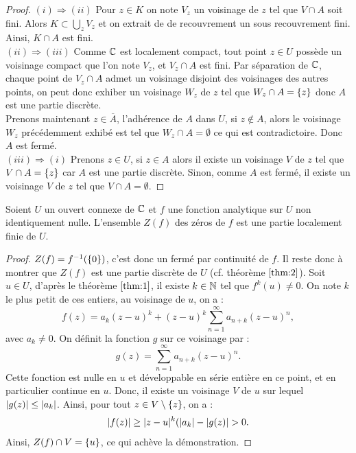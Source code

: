 \begin{proof}
$(i) \Rightarrow (ii)$ Pour $z \in K$ on note $V_z$ un voisinage de $z$ tel que $V \cap A$ soit fini.
Alors $K \subset \bigcup_{z} V_z$ et on extrait de de recouvrement un sous recouvrement fini. 
Ainsi, $K \cap A$ est fini. \\

$(ii) \Rightarrow (iii)$ Comme $\mathbb{C}$ est localement compact, tout point $z \in U$ possède un voisinage compact que l'on note $V_z$,
et $V_z \cap A$ est fini. 
Par séparation de $\mathbb{C}$, chaque point de $V_z \cap A$ admet un voisinage disjoint des voisinages des autres points, on peut donc
exhiber un voisinage $W_z$ de $z$ tel que $W_z \cap A = \{ z \}$ donc $A$ est une partie discrète. \\
Prenons maintenant $z \in \overline{A}$, l'adhérence de $A$ dans $U$, si $z \not \in A$, alors le voisinage $W_z$ précédemment
exhibé est tel que $W_z \cap A = \emptyset$ ce qui est contradictoire. Donc $A$ est fermé. \\

$(iii) \Rightarrow (i)$ Prenons $z \in U$, si $z \in A$ alors il existe un voisinage $V$ de $z$ tel que $V \cap A = \{ z \}$ car $A$
est une partie discrète. Sinon, comme $A$ est fermé, il existe un voisinage $V$ de $z$ tel que $V \cap A = \emptyset$.
\end{proof}

\begin{thm}
Soient $U$ un ouvert connexe de $\mathbb{C}$ et $f$ une fonction analytique sur $U$ non identiquement nulle. 
L'ensemble $Z(f)$ des zéros de $f$ est une partie localement finie de $U$.
\end{thm}

\begin{proof}
$Z(f) = f^{-1}(\{ 0 \})$, c'est donc un fermé par continuité de $f$. 
Il reste donc à montrer que $Z(f)$ est une partie discrète de $U$ (cf. théorème $\ref{thm:2}$). 
Soit $u \in U$, d'après le théorème $\ref{thm:1}$, il existe $k \in \mathbb{N}$ tel que $f^{k}(u) \neq 0$. 
On note $k$ le plus petit de ces entiers, au voisinage de $u$, on a :
\[ f(z) = a_k (z-u)^k + (z-u)^k \sum_{n=1}^{\infty} a_{n+k} (z-u)^n , \]
avec $a_k \neq 0$. On définit la fonction $g$ sur ce voisinage par :
\[ g(z) = \sum_{n=1}^{\infty} a_{n+k} (z-u)^n . \]
Cette fonction est nulle en $u$ et développable en série entière en ce point, et en particulier continue en $u$.
Donc, il existe un voisinage $V$ de $u$ sur lequel $\lvert g(z)\rvert \leq \lvert a_k\rvert$.
Ainsi, pour tout $z \in V \setminus \{ z \}$, on a :
\[ \lvert f(z)\rvert \geq \lvert z-u\rvert^k ( \lvert a_k\rvert - \lvert g(z)\rvert > 0 . \]
Ainsi, $Z(f) \cap V = \{ u \}$, ce qui achève la démonstration.
\end{proof}

